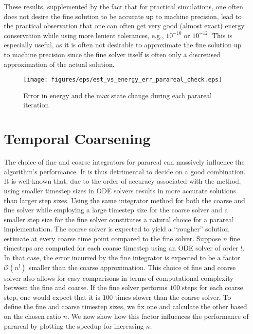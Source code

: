 These results, supplemented by the fact that for practical simulations, one often does not desire the fine solution to be accurate up to machine precision, lead to the practical observation that one can often get very good (almost exact) energy conservation while using more lenient tolerances, e.g., $10^{-10}$ or $10^{-12}$. This is especially useful, as it is often not desirable to approximate the fine solution up to machine precision since the fine solver itself is often only a discretised approximation of the actual solution.
 \begin{figure}[h]
    \centering
    \texttt{[image: figures/eps/est\_vs\_energy\_err\_parareal\_check.eps]}
    \caption{Error in energy and the max state change during each parareal iteration}
    \label{fig: energy-vs-statechange}
\end{figure}


\section{Temporal Coarsening}

The choice of fine and coarse integrators for parareal can massively influence the algorithm's performance. It is thus detrimental to decide on a good combination. It is well-known that, due to the order of accuracy associated with the method, using smaller timestep sizes in ODE solvers results in more accurate solutions than larger step sizes. Using the same integrator method for both the coarse and fine solver while employing a large timestep size for the coarse solver and a smaller step size for the fine solver constitutes a natural choice for a parareal implementation. The coarse solver is expected to yield a ``rougher'' solution estimate at every coarse time point compared to the fine solver. Suppose $n$ fine timesteps are computed for each coarse timestep using an ODE solver of order $l$. In that case, the error incurred by the fine integrator is expected to be a factor $\mathcal{O}(n^l)$ smaller than the coarse approximation. 
This choice of fine and coarse solver also allows for easy comparisons in terms of computational complexity between the fine and coarse. If the fine solver performs $100$ steps for each coarse step, one would expect that it is $100$ times slower than the coarse solver.
\newline 
To define the fine and coarse timestep sizes, we fix one and calculate the other based on the chosen ratio $n$. We now show how this factor influences the performance of parareal by plotting the speedup for increasing $n$.

